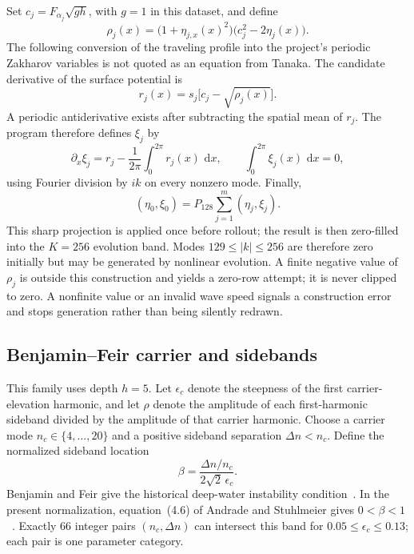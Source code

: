 \documentclass[10pt]{article}
\newcommand{\dd}{\,\mathrm d}
\begin{document}
Set $c_j=F_{\alpha_j}\sqrt{gh}$, with $g=1$ in this dataset, and define
\begin{equation}
  \rho_j(x)
  =
  \bigl(1+\eta_{j,x}(x)^2\bigr)
  \bigl(c_j^2-2\eta_j(x)\bigr).
  \label{eq:tanaka-radicand}
\end{equation}
The following conversion of the traveling profile into the project's
periodic Zakharov variables is not quoted as an equation from Tanaka.  The
candidate derivative of the surface potential is
\[
  r_j(x)=s_j\bigl[c_j-\sqrt{\rho_j(x)}\bigr].
\]
A periodic antiderivative exists after subtracting the spatial mean of
$r_j$.  The program therefore defines $\xi_j$ by
\[
  \partial_x\xi_j=r_j-\frac1{2\pi}\int_0^{2\pi}r_j(x)\,\dd x,
  \qquad
  \int_0^{2\pi}\xi_j(x)\,\dd x=0,
\]
using Fourier division by $ik$ on every nonzero mode.  Finally,
\[
  (\eta_0,\xi_0)
  =
  P_{128}\sum_{j=1}^{m}(\eta_j,\xi_j).
\]
This sharp projection is applied once before rollout; the result is then
zero-filled into the $K=256$ evolution band.  Modes
$129\leq |k|\leq256$ are therefore zero initially but may be generated by
nonlinear evolution.
A finite negative value of $\rho_j$ is outside this construction and yields a
zero-row attempt; it is never clipped to zero.  A nonfinite value or an
invalid wave speed signals a construction error and stops generation rather
than being silently redrawn.

\subsection{Benjamin--Feir carrier and sidebands}

This family uses depth $h=5$.  Let $\epsilon_c$ denote the steepness of the
first carrier-elevation harmonic, and let $\rho$ denote the amplitude of each
first-harmonic sideband divided by the amplitude of that carrier harmonic.
Choose a carrier mode
$n_c\in\{4,\ldots,20\}$ and a positive sideband separation
$\Delta n<n_c$.  Define the normalized sideband location
\begin{equation}
  \beta
  =\frac{\Delta n/n_c}{2\sqrt2\,\epsilon_c}.
  \label{eq:bf-condition}
\end{equation}
Benjamin and Feir give the historical deep-water instability
condition~\cite{benjaminfeir1967}.  In the present normalization,
equation~(4.6) of Andrade and Stuhlmeier gives
$0<\beta<1$~\cite{andrade2023}.  Exactly 66 integer pairs
$(n_c,\Delta n)$ can intersect this band for
$0.05\leq\epsilon_c\leq0.13$; each pair is one parameter category.
\end{document}
